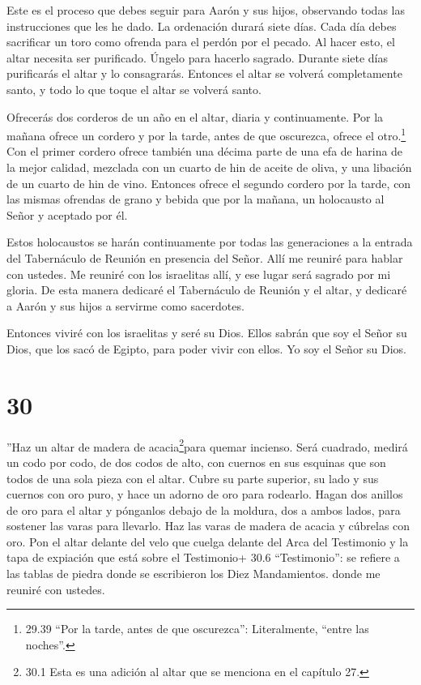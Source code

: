  Este es el proceso que debes seguir para Aarón y sus
hijos, observando todas las instrucciones que les he dado. La ordenación
durará siete días.  Cada día debes sacrificar un toro como
ofrenda para el perdón por el pecado. Al hacer esto, el altar necesita
ser purificado. Úngelo para hacerlo sagrado.  Durante siete
días purificarás el altar y lo consagrarás. Entonces el altar se volverá
completamente santo, y todo lo que toque el altar se volverá santo.

 Ofrecerás dos corderos de un año en el altar, diaria y
continuamente.  Por la mañana ofrece un cordero y por la
tarde, antes de que oscurezca, ofrece el otro.\footnote{29.39 ``Por la
  tarde, antes de que oscurezca'': Literalmente, ``entre las noches''.}
 Con el primer cordero ofrece también una décima parte de
una efa de harina de la mejor calidad, mezclada con un cuarto de hin de
aceite de oliva, y una libación de un cuarto de hin de vino.
 Entonces ofrece el segundo cordero por la tarde, con las
mismas ofrendas de grano y bebida que por la mañana, un holocausto al
Señor y aceptado por él.

 Estos holocaustos se harán continuamente por todas las
generaciones a la entrada del Tabernáculo de Reunión en presencia del
Señor. Allí me reuniré para hablar con ustedes.  Me reuniré
con los israelitas allí, y ese lugar será sagrado por mi gloria.
 De esta manera dedicaré el Tabernáculo de Reunión y el
altar, y dedicaré a Aarón y sus hijos a servirme como sacerdotes.

 Entonces viviré con los israelitas y seré su Dios.
 Ellos sabrán que soy el Señor su Dios, que los sacó de
Egipto, para poder vivir con ellos. Yo soy el Señor su Dios.

\hypertarget{section-29}{%
\section{30}\label{section-29}}

 ''Haz un altar de madera de acacia\footnote{30.1 Esta es
  una adición al altar que se menciona en el capítulo 27.}para quemar
incienso.  Será cuadrado, medirá un codo por codo, de dos
codos de alto, con cuernos en sus esquinas que son todos de una sola
pieza con el altar.  Cubre su parte superior, su lado y sus
cuernos con oro puro, y hace un adorno de oro para rodearlo.
 Hagan dos anillos de oro para el altar y pónganlos debajo
de la moldura, dos a ambos lados, para sostener las varas para llevarlo.
 Haz las varas de madera de acacia y cúbrelas con oro.
 Pon el altar delante del velo que cuelga delante del Arca
del Testimonio y la tapa de expiación que está sobre el Testimonio+ 30.6
``Testimonio'': se refiere a las tablas de piedra donde se escribieron
los Diez Mandamientos. donde me reuniré con ustedes.

